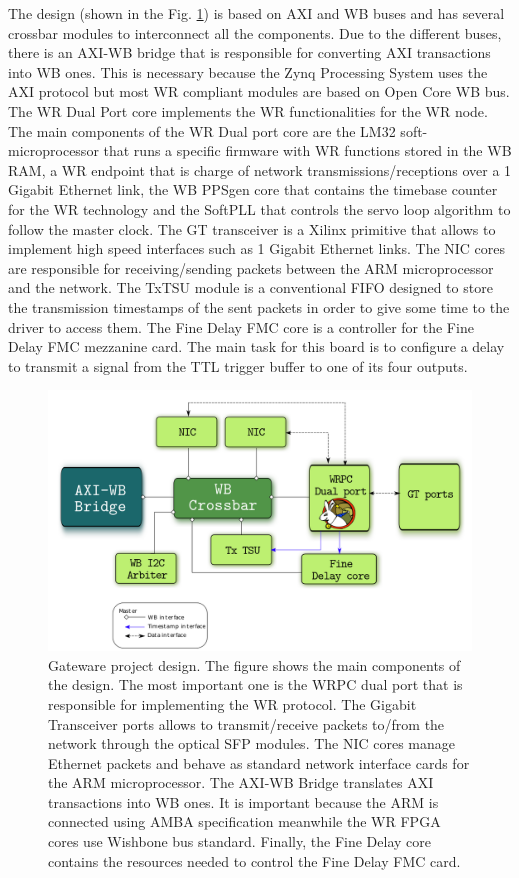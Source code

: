 The design (shown in the Fig. \ref{fig:gateware_first_level}) is based on AXI and WB buses and has several crossbar modules to interconnect
all the components. Due to the different buses, there is an AXI-WB bridge that is responsible 
for converting AXI transactions into WB ones. This is necessary because the Zynq Processing System 
uses the AXI protocol but most WR compliant modules are based on Open Core WB bus. The WR Dual Port 
core implements the WR functionalities for the WR node. The main components of the WR Dual port core 
are the LM32 soft-microprocessor that runs a specific firmware with WR functions stored in the WB RAM, 
a WR endpoint that is charge of network transmissions/receptions over a 1 Gigabit Ethernet link, 
the WB PPSgen core that contains the timebase counter for the WR technology and the SoftPLL
that controls the servo loop algorithm to follow the master clock. The GT transceiver is a Xilinx primitive
that allows to implement high speed interfaces such as 1 Gigabit Ethernet links. The NIC cores are responsible
for receiving/sending packets between the ARM microprocessor and the network. The TxTSU module is a conventional
FIFO designed to store the transmission timestamps of the sent packets in order to give some time to the driver to
access them. The Fine Delay FMC core is a controller for the Fine Delay FMC mezzanine card. The main task for this 
board is to configure a delay to transmit a signal from the TTL trigger buffer to one of its four outputs.


\begin{figure}[H]
	\centering
	\includegraphics[scale=0.4]{img/gateware_first_level}
	\caption{Gateware project design. The figure shows the main components of the design. The most important one is the WRPC dual port that is responsible for implementing the WR protocol. The Gigabit Transceiver ports allows to transmit/receive packets to/from the network through the optical SFP modules. The NIC cores manage Ethernet packets and behave as standard network interface cards for the ARM microprocessor. The AXI-WB Bridge translates AXI transactions into WB ones. It is important because the ARM is connected using AMBA specification meanwhile the WR FPGA cores use Wishbone bus standard. Finally, the Fine Delay core contains the resources needed to control the Fine Delay FMC card.}
	\label{fig:gateware_first_level}
\end{figure}

